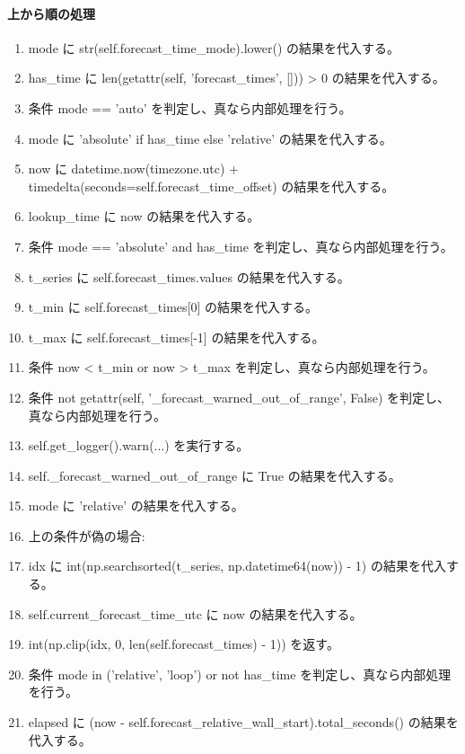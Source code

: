 \documentclass[a4paper,11pt]{article}
\begin{document}
            \paragraph{上から順の処理}
            \begin{enumerate}[leftmargin=1.8em]
            \item mode に str(self.forecast\_time\_mode).lower() の結果を代入する。
\item has\_time に len(getattr(self, 'forecast\_times', [])) > 0 の結果を代入する。
\item 条件 mode == 'auto' を判定し、真なら内部処理を行う。
\item   mode に 'absolute' if has\_time else 'relative' の結果を代入する。
\item now に datetime.now(timezone.utc) + timedelta(seconds=self.forecast\_time\_offset) の結果を代入する。
\item lookup\_time に now の結果を代入する。
\item 条件 mode == 'absolute' and has\_time を判定し、真なら内部処理を行う。
\item   t\_series に self.forecast\_times.values の結果を代入する。
\item   t\_min に self.forecast\_times[0] の結果を代入する。
\item   t\_max に self.forecast\_times[-1] の結果を代入する。
\item   条件 now < t\_min or now > t\_max を判定し、真なら内部処理を行う。
\item     条件 not getattr(self, '\_forecast\_warned\_out\_of\_range', False) を判定し、真なら内部処理を行う。
\item       self.get\_logger().warn(...) を実行する。
\item       self.\_forecast\_warned\_out\_of\_range に True の結果を代入する。
\item     mode に 'relative' の結果を代入する。
\item     上の条件が偽の場合:
\item     idx に int(np.searchsorted(t\_series, np.datetime64(now)) - 1) の結果を代入する。
\item     self.current\_forecast\_time\_utc に now の結果を代入する。
\item     int(np.clip(idx, 0, len(self.forecast\_times) - 1)) を返す。
\item 条件 mode in ('relative', 'loop') or not has\_time を判定し、真なら内部処理を行う。
\item   elapsed に (now - self.forecast\_relative\_wall\_start).total\_seconds() の結果を代入する。

\end{enumerate}
\end{document}
